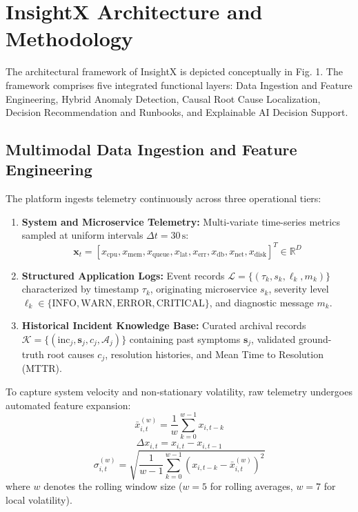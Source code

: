\documentclass[conference]{IEEEtran}
\begin{document}
\section{InsightX Architecture and Methodology}

The architectural framework of InsightX is depicted conceptually in Fig. 1. The framework comprises five integrated functional layers: Data Ingestion and Feature Engineering, Hybrid Anomaly Detection, Causal Root Cause Localization, Decision Recommendation and Runbooks, and Explainable AI Decision Support.

\subsection{Multimodal Data Ingestion and Feature Engineering}
The platform ingests telemetry continuously across three operational tiers:
\begin{enumerate}
    \item \textbf{System and Microservice Telemetry:} Multi-variate time-series metrics sampled at uniform intervals $\Delta t = 30\,\text{s}$:
    $$\mathbf{x}_t = [x_{\text{cpu}}, x_{\text{mem}}, x_{\text{queue}}, x_{\text{lat}}, x_{\text{err}}, x_{\text{db}}, x_{\text{net}}, x_{\text{disk}}]^T \in \mathbb{R}^D$$
    \item \textbf{Structured Application Logs:} Event records $\mathcal{L} = \{(\tau_k, s_k, \ell_k, m_k)\}$ characterized by timestamp $\tau_k$, originating microservice $s_k$, severity level $\ell_k \in \{\text{INFO}, \text{WARN}, \text{ERROR}, \text{CRITICAL}\}$, and diagnostic message $m_k$.
    \item \textbf{Historical Incident Knowledge Base:} Curated archival records $\mathcal{K} = \{(\text{inc}_j, \mathbf{s}_j, c_j, \mathcal{A}_j)\}$ containing past symptoms $\mathbf{s}_j$, validated ground-truth root causes $c_j$, resolution histories, and Mean Time to Resolution (MTTR).
\end{enumerate}

To capture system velocity and non-stationary volatility, raw telemetry undergoes automated feature expansion:
\begin{equation}
\bar{x}_{i, t}^{(w)} = \frac{1}{w} \sum_{k=0}^{w-1} x_{i, t-k}
\end{equation}
\begin{equation}
\Delta x_{i, t} = x_{i, t} - x_{i, t-1}
\end{equation}
\begin{equation}
\sigma_{i, t}^{(w)} = \sqrt{\frac{1}{w-1} \sum_{k=0}^{w-1} (x_{i, t-k} - \bar{x}_{i, t}^{(w)})^2}
\end{equation}
where $w$ denotes the rolling window size ($w=5$ for rolling averages, $w=7$ for local volatility).
\end{document}
